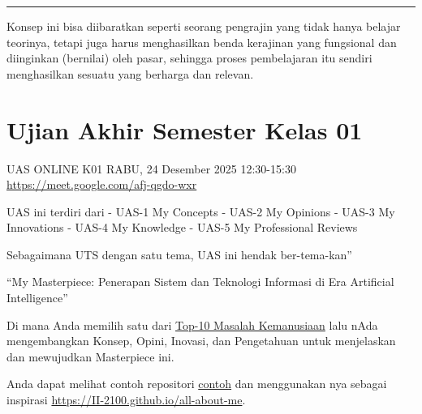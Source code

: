 \documentclass[
  letterpaper,
  DIV=11,
  numbers=noendperiod]{scrreprt}
\begin{document}
\begin{center}\rule{0.5\linewidth}{0.5pt}\end{center}

Konsep ini bisa diibaratkan seperti seorang pengrajin yang tidak hanya
belajar teorinya, tetapi juga harus menghasilkan benda kerajinan yang
fungsional dan diinginkan (bernilai) oleh pasar, sehingga proses
pembelajaran itu sendiri menghasilkan sesuatu yang berharga dan relevan.


\chapter*{Ujian Akhir Semester Kelas
01}\label{ujian-akhir-semester-kelas-01}


\begin{tcolorbox}[enhanced jigsaw, breakable, rightrule=.15mm, colbacktitle=quarto-callout-important-color!10!white, opacityback=0, titlerule=0mm, leftrule=.75mm, bottomrule=.15mm, toptitle=1mm, colframe=quarto-callout-important-color-frame, bottomtitle=1mm, arc=.35mm, coltitle=black, opacitybacktitle=0.6, toprule=.15mm, left=2mm, title=\textcolor{quarto-callout-important-color}{\faExclamation}\hspace{0.5em}{Important}, colback=white]

UAS ONLINE K01 RABU, 24 Desember 2025 12:30-15:30
\url{https://meet.google.com/afj-qgdo-wxr}

\end{tcolorbox}

UAS ini terdiri dari - UAS-1 My Concepts - UAS-2 My Opinions - UAS-3 My
Innovations - UAS-4 My Knowledge - UAS-5 My Professional Reviews

Sebagaimana UTS dengan satu tema, UAS ini hendak ber-tema-kan''

``My Masterpiece: Penerapan Sistem dan Teknologi Informasi di Era
Artificial Intelligence''

Di mana Anda memilih satu dari \href{../bahan/top10.pdf}{Top-10 Masalah
Kemanusiaan} lalu nAda mengembangkan Konsep, Opini, Inovasi, dan
Pengetahuan untuk menjelaskan dan mewujudkan Masterpiece ini.

Anda dapat melihat contoh repositori
\href{https://github.com/II-2100/all-about-me}{contoh} dan menggunakan
nya sebagai inspirasi \url{https://II-2100.github.io/all-about-me}.
\end{document}
